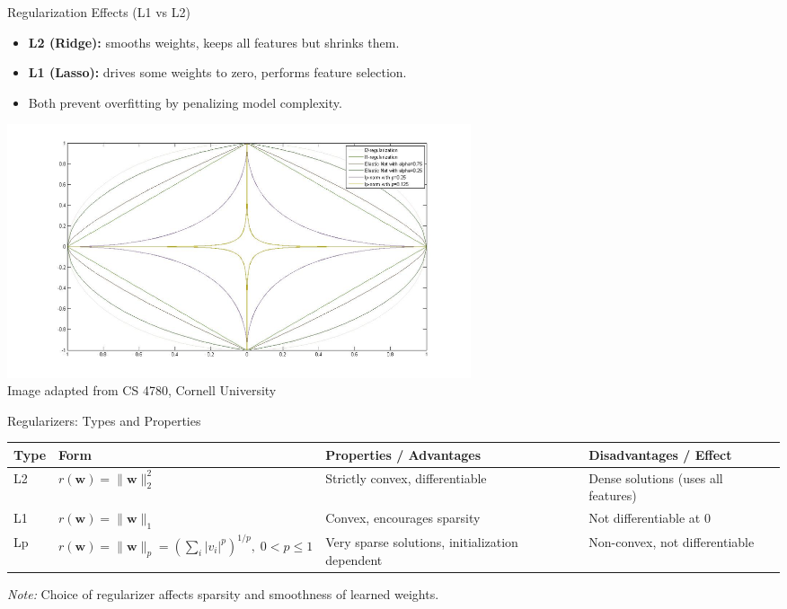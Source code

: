 \documentclass[serif, aspectratio=169]{beamer}
\begin{document}
    \begin{frame}{Regularization Effects (L1 vs L2)}
        \begin{itemize}
            \item \textbf{L2 (Ridge):} smooths weights, keeps all features but shrinks them.
            \item \textbf{L1 (Lasso):} drives some weights to zero, performs feature selection.
            \item Both prevent overfitting by penalizing model complexity.
        \end{itemize}
        \centering
        \includegraphics[width=0.6\textwidth]{pic/regularizers.jpg}
        \vspace{0.3em}
        \\
        {\scriptsize Image adapted from CS 4780, Cornell University}
    \end{frame}
    \begin{frame}{Regularizers: Types and Properties}
        \centering
        \small
        \renewcommand{\arraystretch}{2} %
        \begin{tabular}{|p{1cm}|p{3.2cm}|p{4.5cm}|p{4cm}|}
            \hline
            \textbf{Type} & \textbf{Form} & \textbf{Properties / Advantages} & \textbf{Disadvantages / Effect} \\ \hline
            L2 & $r(\mathbf{w}) = \|\mathbf{w}\|_2^2$
            & Strictly convex, differentiable
            & Dense solutions (uses all features) \\ \hline
            L1 & $r(\mathbf{w}) = \|\mathbf{w}\|_1$
            & Convex, encourages sparsity
            & Not differentiable at 0 \\ \hline
            Lp & $r(\mathbf{w}) = \|\mathbf{w}\|_p = (\sum_i |v_i|^p)^{1/p}, \; 0<p\le 1$
            & Very sparse solutions, initialization dependent
            & Non-convex, not differentiable \\ \hline
        \end{tabular}

        \vspace{0.8em}
        \scriptsize
        \textit{Note:} Choice of regularizer affects sparsity and smoothness of learned weights.
    \end{frame}
\end{document}
